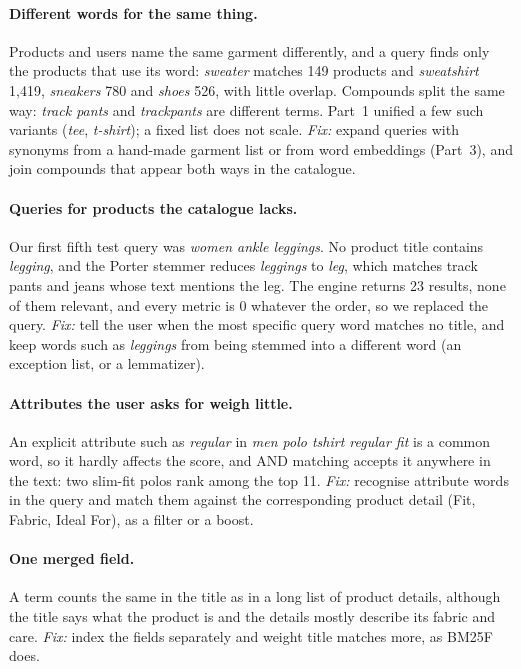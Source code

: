 \documentclass[11pt,a4paper]{article}
\begin{document}
\paragraph{Different words for the same thing.} Products and users name the
same garment differently, and a query finds only the products that use its
word: \emph{sweater} matches 149 products and \emph{sweatshirt} 1{,}419,
\emph{sneakers} 780 and \emph{shoes} 526, with little overlap. Compounds split
the same way: \emph{track pants} and \emph{trackpants} are different terms.
Part~1 unified a few such variants (\emph{tee}, \emph{t-shirt}); a fixed list
does not scale. \emph{Fix:} expand queries with synonyms from a hand-made
garment list or from word embeddings (Part~3), and join compounds that appear
both ways in the catalogue.

\paragraph{Queries for products the catalogue lacks.} Our first fifth test
query was \emph{women ankle leggings}. No product title contains
\emph{legging}, and the Porter stemmer reduces \emph{leggings} to \emph{leg},
which matches track pants and jeans whose text mentions the leg. The engine
returns 23 results, none of them relevant, and every metric is 0 whatever the
order, so we replaced the query. \emph{Fix:} tell the user when the most
specific query word matches no title, and keep words such as \emph{leggings}
from being stemmed into a different word (an exception list, or a lemmatizer).

\paragraph{Attributes the user asks for weigh little.} An explicit attribute
such as \emph{regular} in \emph{men polo tshirt regular fit} is a common word,
so it hardly affects the score, and AND matching accepts it anywhere in the
text: two slim-fit polos rank among the top 11. \emph{Fix:} recognise
attribute words in the query and match them against the corresponding product
detail (Fit, Fabric, Ideal For), as a filter or a boost.

\paragraph{One merged field.} A term counts the same in the title as in a long
list of product details, although the title says what the product is and the
details mostly describe its fabric and care. \emph{Fix:} index the fields
separately and weight title matches more, as BM25F does.
\end{document}
